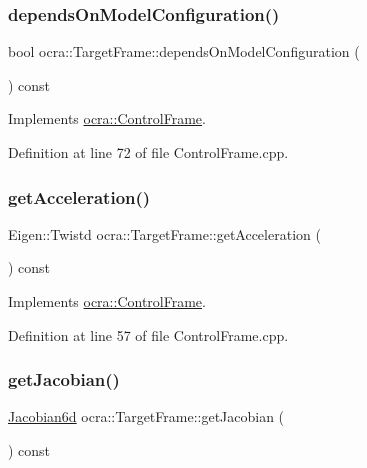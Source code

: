 \subsubsection{\texorpdfstring{depends\+On\+Model\+Configuration()}{dependsOnModelConfiguration()}}
{\footnotesize\ttfamily bool ocra\+::\+Target\+Frame\+::depends\+On\+Model\+Configuration (\begin{DoxyParamCaption}{ }\end{DoxyParamCaption}) const\hspace{0.3cm}{\ttfamily [virtual]}}



Implements \hyperlink{classocra_1_1ControlFrame_a65833d1f3f42bc8d452f8b1fb671e142}{ocra\+::\+Control\+Frame}.



Definition at line 72 of file Control\+Frame.\+cpp.

\hypertarget{classocra_1_1TargetFrame_ab38d91f0d2f90b102259ec155a8a1245}{}\label{classocra_1_1TargetFrame_ab38d91f0d2f90b102259ec155a8a1245} 
\subsubsection{\texorpdfstring{get\+Acceleration()}{getAcceleration()}}
{\footnotesize\ttfamily Eigen\+::\+Twistd ocra\+::\+Target\+Frame\+::get\+Acceleration (\begin{DoxyParamCaption}{ }\end{DoxyParamCaption}) const\hspace{0.3cm}{\ttfamily [virtual]}}



Implements \hyperlink{classocra_1_1ControlFrame_a0ceb7cd7c3fe90fa0ef311b96a6f5c88}{ocra\+::\+Control\+Frame}.



Definition at line 57 of file Control\+Frame.\+cpp.

\hypertarget{classocra_1_1TargetFrame_a94d2746633b7112afae754370a3a3e1f}{}\label{classocra_1_1TargetFrame_a94d2746633b7112afae754370a3a3e1f} 
\subsubsection{\texorpdfstring{get\+Jacobian()}{getJacobian()}}
{\footnotesize\ttfamily \hyperlink{namespaceocra_ac73b015f9f7cb0c252c4d5c4800f559a}{Jacobian6d} ocra\+::\+Target\+Frame\+::get\+Jacobian (\begin{DoxyParamCaption}{ }\end{DoxyParamCaption}) const\hspace{0.3cm}{\ttfamily [virtual]}}



